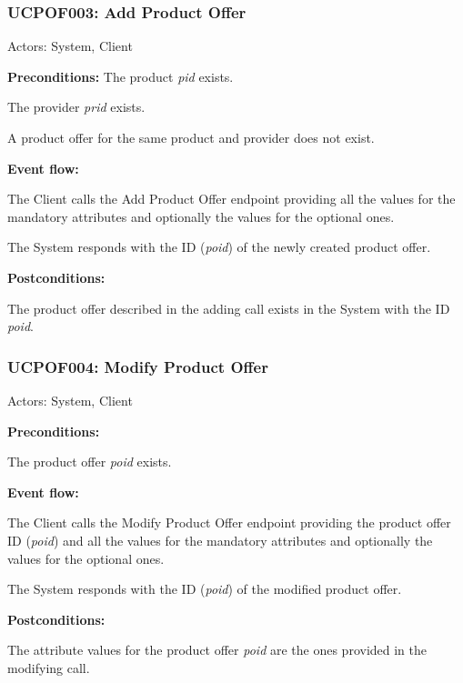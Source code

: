 \begin{ucbox}{\subsubsection{UCPOF003: Add Product Offer}}
\label{UCPOF003}

Actors: System, Client

\textbf{Preconditions:} 
\ucitem The product \textit{pid} exists.

\ucitem The provider \textit{prid} exists.

\ucitem A product offer for the same product and provider does not exist.

\textbf{Event flow:}

\ucitem The Client calls the Add Product Offer endpoint providing all the values for the mandatory attributes and optionally the values for the optional ones.

\ucitem The System responds with the ID (\textit{poid}) of the newly created product offer.

\textbf{Postconditions:}

\ucitem The product offer described in the adding call exists in the System with the ID \textit{poid}.

\end{ucbox}

\begin{ucbox}{\subsubsection{UCPOF004: Modify Product Offer}}
\label{UCPOF004}

Actors: System, Client

\textbf{Preconditions:}

\ucitem The product offer \textit{poid} exists.

\textbf{Event flow:}

\ucitem The Client calls the Modify Product Offer endpoint providing the product offer ID (\textit{poid}) and all the values for the mandatory attributes and optionally the values for the optional ones.

\ucitem The System responds with the ID (\textit{poid}) of the modified product offer.

\textbf{Postconditions:}

\ucitem The attribute values for the product offer \textit{poid} are the ones provided in the modifying call.

\end{ucbox}

